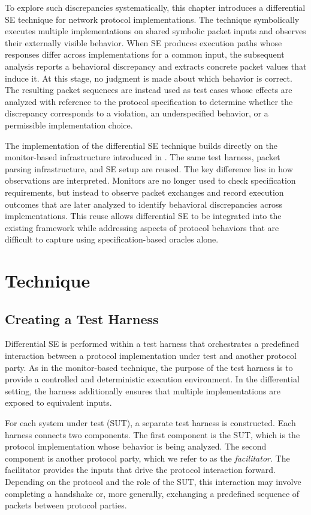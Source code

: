 To explore such discrepancies systematically, this chapter introduces a differential SE technique for network protocol implementations.
The technique symbolically executes multiple implementations on shared symbolic packet inputs and observes their externally visible behavior.
When SE produces execution paths whose responses differ across implementations for a common input, the subsequent analysis reports a behavioral discrepancy and extracts concrete packet values that induce it.
At this stage, no judgment is made about which behavior is correct.
The resulting packet sequences are instead used as test cases whose effects are analyzed with reference to the protocol specification to determine whether the discrepancy corresponds to a violation, an underspecified behavior, or a permissible implementation choice.

The implementation of the differential SE technique builds directly on the monitor-based infrastructure introduced in .
The same test harness, packet parsing infrastructure, and SE setup are reused.
The key difference lies in how observations are interpreted.
Monitors are no longer used to check specification requirements, but instead to observe packet exchanges and record execution outcomes that are later analyzed to identify behavioral discrepancies across implementations.
This reuse allows differential SE to be integrated into the existing framework while addressing aspects of protocol behaviors that are difficult to capture using specification-based oracles alone.
\section{Technique}
\subsection{Creating a Test Harness}\label{sec:paper3:test-harness}
Differential SE is performed within a test harness that orchestrates a predefined interaction between a protocol implementation under test and another protocol party.
As in the monitor-based technique, the purpose of the test harness is to provide a controlled and deterministic execution environment.
In the differential setting, the harness additionally ensures that multiple implementations are exposed to equivalent inputs.

For each system under test (SUT), a separate test harness is constructed.
Each harness connects two components.
The first component is the SUT, which is the protocol implementation whose behavior is being analyzed.
The second component is another protocol party, which we refer to as the \emph{facilitator}.
The facilitator provides the inputs that drive the protocol interaction forward.
Depending on the protocol and the role of the SUT, this interaction may involve completing a handshake or, more generally, exchanging a predefined sequence of packets between protocol parties.

